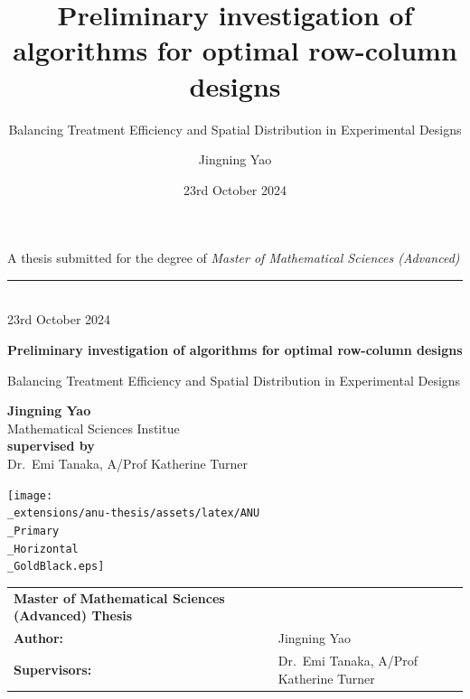 \documentclass[
  a4paper,
  oneside,
  openany,
  12pt,
  onecolumn]{book}
\title{Preliminary investigation of algorithms for optimal row-column
designs}
\subtitle{Balancing Treatment Efficiency and Spatial Distribution in
Experimental Designs}
\author{Jingning Yao}
\date{23rd October 2024}
\theoremstyle{definition}
\theoremstyle{definition}
\theoremstyle{plain}
\theoremstyle{remark}
\begin{document}
  \begin{frontmatter}
  \begin{titlepage}

  \begin{titlepage}
    \begin{flushright}%
      \vspace{50mm}
      {\small A thesis submitted for the degree of {\it Master of
  Mathematical Sciences (Advanced)}}
      \rule[1ex]{\textwidth}{1pt}\\
      {\fontsize{9}{0} 23rd October 2024}\\
      \vspace{25mm}
      {\fontsize{34}{38}\bfseries Preliminary investigation of
  algorithms for optimal row-column designs\par}
        \vspace{12mm}
    	\parbox{\textwidth}{
  	\begin{flushright}
  		\fontsize{28}{30} Balancing Treatment Efficiency and Spatial
  Distribution in Experimental Designs
  	\end{flushright}}
  	    \vfill
      {\fontsize{20}{0}\bfseries Jingning Yao}\\
      \vspace{2mm}
      {\fontsize{8}{0} Mathematical Sciences Institue}\\
      \vspace{35mm}
      {\fontsize{10}{0}\bfseries supervised by}\\
      Dr.~Emi Tanaka, A/Prof Katherine Turner
      
      \vspace{2.0cm}
  		\texttt{[image: \\\_extensions/anu-thesis/assets/latex/ANU\\\_Primary\\\_Horizontal\\\_GoldBlack.eps]}\\
   \end{flushright}%

   \clearpage\thispagestyle{empty}
   \normalfont
   \vspace*{\fill}
   \noindent
   \begin{tabular}{lp{40cm}}
     {\bf Master of Mathematical Sciences (Advanced) Thesis} & \\[2mm]
     {\bf Author:} & Jingning Yao\\[2mm]
     {\bf Supervisors:} & Dr.~Emi Tanaka, A/Prof Katherine Turner\\[2mm]
     

\end{tabular}
\end{titlepage}
\end{titlepage}
\end{frontmatter}
\end{document}
